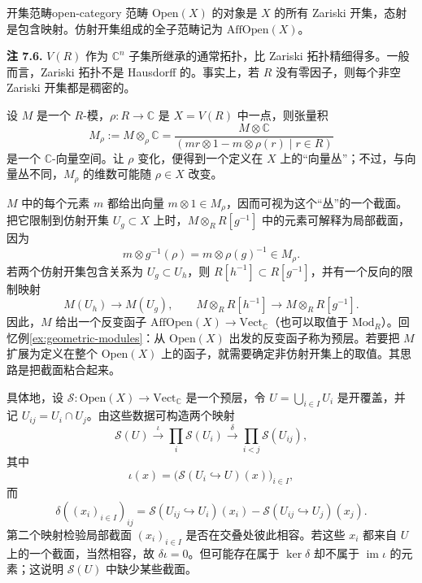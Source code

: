 \begin{definition}{开集范畴}{open-category}
范畴 $\mathrm{Open}(X)$ 的对象是 $X$ 的所有 Zariski 开集，态射是包含映射。仿射开集组成的全子范畴记为 $\mathrm{AffOpen}(X)$。
\end{definition}

\begin{note}\label{note:zariski-topology}
\textbf{注 7.6.} $V(R)$ 作为 $\mathbb C^n$ 子集所继承的通常拓扑，比 Zariski 拓扑精细得多。一般而言，Zariski 拓扑不是 Hausdorff 的。事实上，若 $R$ 没有零因子，则每个非空 Zariski 开集都是稠密的。
\end{note}

设 $M$ 是一个 $R$-模，$\rho\colon R\to\mathbb C$ 是 $X=V(R)$ 中一点，则张量积
\[
  M_\rho:=M\otimes_\rho\mathbb C
  =\frac{M\otimes\mathbb C}{(mr\otimes1-m\otimes\rho(r)\mid r\in R)}
\]
是一个 $\mathbb C$-向量空间。让 $\rho$ 变化，便得到一个定义在 $X$ 上的“向量丛”；不过，与向量丛不同，$M_\rho$ 的维数可能随 $\rho\in X$ 改变。

$M$ 中的每个元素 $m$ 都给出向量 $m\otimes1\in M_\rho$，因而可视为这个“丛”的一个截面。把它限制到仿射开集 $U_g\subset X$ 上时，$M\otimes_RR[g^{-1}]$ 中的元素可解释为局部截面，因为
\[
  m\otimes g^{-1}(\rho)=m\otimes\rho(g)^{-1}\in M_\rho.
\]
若两个仿射开集包含关系为 $U_g\subset U_h$，则 $R[h^{-1}]\subset R[g^{-1}]$，并有一个反向的限制映射
\[
  M(U_h)\longrightarrow M(U_g),\qquad
  M\otimes_RR[h^{-1}]\longrightarrow M\otimes_RR[g^{-1}].
\]
因此，$M$ 给出一个反变函子 $\mathrm{AffOpen}(X)\to\mathrm{Vect}_{\mathbb C}$（也可以取值于 $\mathrm{Mod}_R$）。回忆例\ref{ex:geometric-modules}：从 $\mathrm{Open}(X)$ 出发的反变函子称为预层。若要把 $M$ 扩展为定义在整个 $\mathrm{Open}(X)$ 上的函子，就需要确定非仿射开集上的取值。其思路是把截面粘合起来。

具体地，设 $\mathcal S\colon\mathrm{Open}(X)\to\mathrm{Vect}_{\mathbb C}$ 是一个预层，令 $U=\bigcup_{i\in I}U_i$ 是开覆盖，并记 $U_{ij}=U_i\cap U_j$。由这些数据可构造两个映射
\[
  \mathcal S(U)\xrightarrow{\iota}\prod_i\mathcal S(U_i)
  \xrightarrow{\delta}\prod_{i<j}\mathcal S(U_{ij}),
\]
其中
\[
  \iota(x)=\bigl(\mathcal S(U_i\hookrightarrow U)(x)\bigr)_{i\in I},
\]
而
\[
  \delta((x_i)_{i\in I})_{ij}
  =\mathcal S(U_{ij}\hookrightarrow U_i)(x_i)
   -\mathcal S(U_{ij}\hookrightarrow U_j)(x_j).
\]
第二个映射检验局部截面 $(x_i)_{i\in I}$ 是否在交叠处彼此相容。若这些 $x_i$ 都来自 $U$ 上的一个截面，当然相容，故 $\delta\iota=0$。但可能存在属于 $\ker\delta$ 却不属于 $\operatorname{im}\iota$ 的元素；这说明 $\mathcal S(U)$ 中缺少某些截面。

